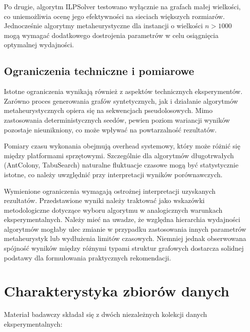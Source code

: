 Po drugie, algorytm ILPSolver testowano wyłącznie na grafach małej wielkości, co uniemożliwia ocenę jego efektywności na sieciach większych rozmiarów. Jednocześnie algorytmy metaheurystyczne dla instancji o wielkości $n > 1000$ mogą wymagać dodatkowego dostrojenia parametrów w celu osiągnięcia optymalnej wydajności.

\subsection{Ograniczenia techniczne i pomiarowe}

Istotne ograniczenia wynikają również z aspektów technicznych eksperymentów. Zarówno proces generowania grafów syntetycznych, jak i działanie algorytmów metaheurystycznych opiera się na sekwencjach pseudolosowych. Mimo zastosowania deterministycznych seedów, pewien poziom wariancji wyników pozostaje nieunikniony, co może wpływać na powtarzalność rezultatów.

Pomiary czasu wykonania obejmują overhead systemowy, który może różnić się między platformami sprzętowymi. Szczególnie dla algorytmów długotrwałych (AntColony, TabuSearch) naturalne fluktuacje czasowe mogą być statystycznie istotne, co należy uwzględnić przy interpretacji wyników porównawczych.

Wymienione ograniczenia wymagają ostrożnej interpretacji uzyskanych rezultatów. Przedstawione wyniki należy traktować jako wskazówki metodologiczne dotyczące wyboru algorytmu w analogicznych warunkach eksperymentalnych. Należy mieć na uwadze, że względna hierarchia wydajności algorytmów mogłaby ulec zmianie w przypadku zastosowania innych parametrów metaheurystyk lub wydłużenia limitów czasowych. Niemniej jednak obserwowana spójność wyników między różnymi typami struktur grafowych dostarcza solidnej podstawy dla formułowania praktycznych rekomendacji.

\section{Charakterystyka zbiorów danych}

Materiał badawczy składał się z dwóch niezależnych kolekcji danych eksperymentalnych:

